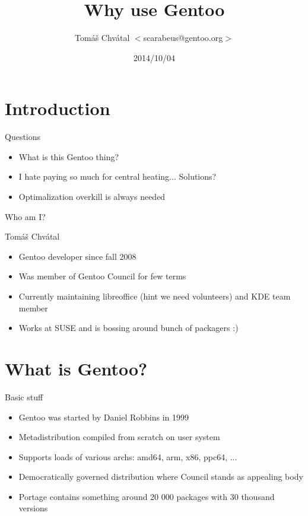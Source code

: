 \documentclass{beamer}
\title{Why use Gentoo}
\author[Tomáš Chvátal]{Tomáš Chvátal $<$scarabeus@gentoo.org$>$}
\date{2014/10/04}
\begin{document}
\frame{\titlepage}
\section{Introduction}
\begin{frame}{Questions}
\begin{itemize}
	\item What is this Gentoo thing?
	\item I hate paying so much for central heating... Solutions?
	\item Optimalization overkill is always needed
\end{itemize}
\end{frame}

\begin{frame}{Who am I?}
	\begin{center}Tomáš Chvátal\end{center}
	\begin{itemize}
		\item Gentoo developer since fall 2008
		\item Was member of Gentoo Council for few terms
		\item Currently maintaining libreoffice (hint we need volunteers) and KDE team member
		\item Works at SUSE and is bossing around bunch of packagers :)
	\end{itemize}
\end{frame}
\section{What is Gentoo?}
\begin{frame}{Basic stuff}
	\begin{itemize}
		\item Gentoo was started by Daniel Robbins in 1999
		\item Metadistribution compiled from scratch on user system
		\item Supports loads of various archs: amd64, arm, x86, ppc64, ...
		\item Democratically governed distribution where Council stands as appealing body
		\item Portage contains something around 20 000 packages with 30 thousand versions
	\end{itemize}
\end{frame}
\end{document}

